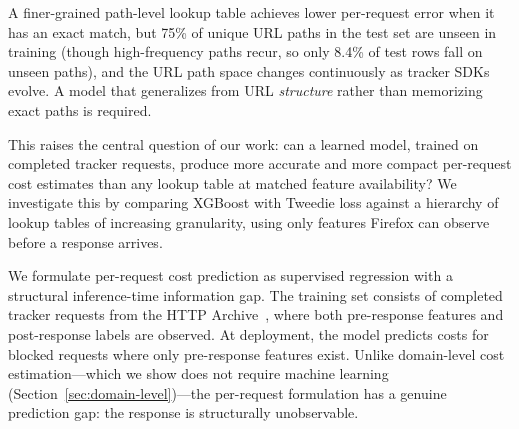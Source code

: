 \documentclass[sigconf,nonacm]{acmart}
\begin{document}
A finer-grained path-level lookup table achieves lower per-request error when it has an exact match, but 75\% of unique URL paths in the test set are unseen in training (though high-frequency paths recur, so only 8.4\% of test rows fall on unseen paths), and the URL path space changes continuously as tracker SDKs evolve.
A model that generalizes from URL \emph{structure} rather than memorizing exact paths is required.

This raises the central question of our work: can a learned model, trained on completed tracker requests, produce more accurate and more compact per-request cost estimates than any lookup table at matched feature availability?
We investigate this by comparing XGBoost with Tweedie loss against a hierarchy of lookup tables of increasing granularity, using only features Firefox can observe before a response arrives.

We formulate per-request cost prediction as supervised regression with a structural inference-time information gap.
The training set consists of completed tracker requests from the HTTP Archive~\cite{httparchive}, where both pre-response features and post-response labels are observed.
At deployment, the model predicts costs for blocked requests where only pre-response features exist.
Unlike domain-level cost estimation---which we show does not require machine learning (Section~\ref{sec:domain-level})---the per-request formulation has a genuine prediction gap: the response is structurally unobservable.
\end{document}
